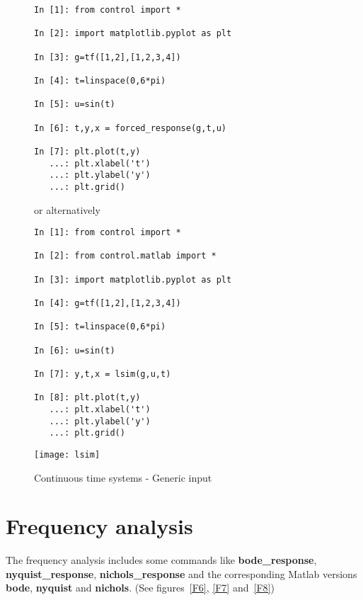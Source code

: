\begin{figure}[htbp]  %
\begin{minipage}[t]{0.55\textwidth}
  \vspace{0pt}
\begin{lstlisting}[linewidth=7cm,xleftmargin=0cm]
In [1]: from control import *

In [2]: import matplotlib.pyplot as plt

In [3]: g=tf([1,2],[1,2,3,4])

In [4]: t=linspace(0,6*pi)

In [5]: u=sin(t)

In [6]: t,y,x = forced_response(g,t,u)

In [7]: plt.plot(t,y)
   ...: plt.xlabel('t')
   ...: plt.ylabel('y')
   ...: plt.grid()
\end{lstlisting}

or alternatively

\begin{lstlisting}[linewidth=7cm,xleftmargin=0cm]
In [1]: from control import *

In [2]: from control.matlab import *

In [3]: import matplotlib.pyplot as plt

In [4]: g=tf([1,2],[1,2,3,4])

In [5]: t=linspace(0,6*pi)

In [6]: u=sin(t)

In [7]: y,t,x = lsim(g,u,t)

In [8]: plt.plot(t,y)
   ...: plt.xlabel('t')
   ...: plt.ylabel('y')
   ...: plt.grid()
\end{lstlisting}
\end{minipage}%
\begin{minipage}[t]{0.5\textwidth}
  \vspace{0pt} \centering
  \texttt{[image: lsim]}
\end{minipage}
\caption{Continuous time systems - Generic input}
\label{F5}
\end{figure}

\newpage
\section{Frequency analysis}

The frequency analysis includes some commands like \textbf{bode\_response}, 
\textbf{nyquist\_response}, \textbf{nichols\_response} and the corresponding 
Matlab versions \textbf{bode}, \textbf{nyquist} and \textbf{nichols}. (See 
figures~\ref{F6}, \ref{F7} and~\ref{F8})

